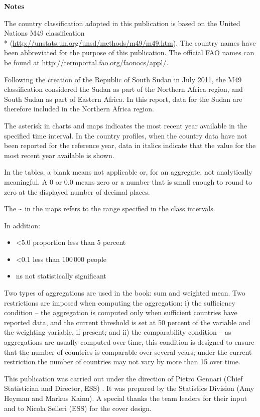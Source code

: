 \onecolumn
\LARGE
\textbf{Notes}

\footnotesize
The country classification adopted in this publication is based on the United Nations M49 classification \\* (\url{http://unstats.un.org/unsd/methods/m49/m49.htm}). The country names have been abbreviated for the purpose of this publication. The official FAO names can be found at \url{http://termportal.fao.org/faonocs/appl/}.

Following the creation of the Republic of South Sudan in July 2011, the M49 classification considered the Sudan as part of the Northern Africa region, and South Sudan as part of Eastern Africa. In this report, data for the Sudan are therefore included in the Northern Africa region.

The asterisk in charts and maps indicates the most recent year available in the specified time interval. In the country profiles, when the country data have not been reported for the reference year, data in italics indicate that the value for the most recent year available is shown.

In the tables, a blank means not applicable or, for an aggregate, not analytically meaningful. A 0 or 0.0 means zero or a number that is small enough to round to zero at the displayed number of decimal places.

The \textasciitilde{} in the maps refers to the range specified in the class intervals.

In addition:
\begin{itemize}
\item <5.0 proportion less than 5 percent
\item <0.1 less than 100\,000 people
\item ns not statistically significant 
\end{itemize}

Two types of aggregations are used in the book: sum and weighted mean. Two restrictions are imposed when computing the aggregation: i) the sufficiency condition – the aggregation is computed only when sufficient countries have reported data, and the current threshold is set at 50 percent of the variable and the weighting variable, if present; and ii) the comparability condition – as aggregations are usually computed over time, this condition is designed to ensure that the number of countries is comparable over several years; under the current restriction the number of countries may not vary by more than 15 over time.

This publication was carried out under the direction of Pietro Gennari (Chief Statistician and Director, ESS) . It was prepared by the Statistics Division (Amy Heyman and Markus Kainu). A special thanks the team leaders for their input and to Nicola Selleri (ESS) for the cover design.
